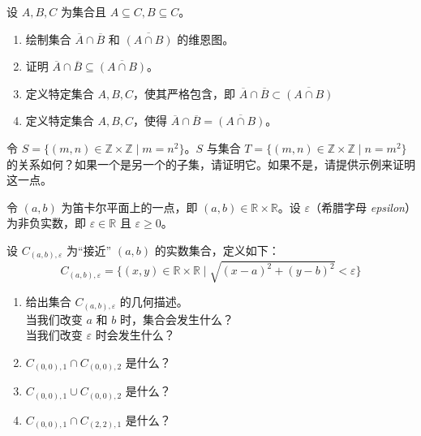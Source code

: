 \begin{exercise}
    设 $A, B, C$ 为集合且 $A \subseteq C, B \subseteq C$。
    \begin{enumerate}[label=(\alph*)]
        \item 绘制集合 $\overline{A} \cap \overline{B}$ 和 $\overline{(A \cap B)}$ 的维恩图。
        \item 证明 $\overline{A} \cap \overline{B} \subseteq \overline{(A \cap B)}$。
        \item 定义特定集合 $A,B,C$，使其严格包含，即 $\overline{A} \cap \overline{B} \subset \overline{(A \cap B)}$
        \item 定义特定集合 $A,B,C$，使得 $\overline{A} \cap \overline{B} = \overline{(A \cap B)}$。
    \end{enumerate}
\end{exercise}

\begin{exercise}
    令 $S = \{(m, n) \in \mathbb{Z} \times \mathbb{Z} \mid m = n^2\}$。$S$ 与集合 $T = \{(m, n) \in \mathbb{Z} \times \mathbb{Z} \mid n = m^2\}$ 的关系如何？如果一个是另一个的子集，请证明它。如果不是，请提供示例来证明这一点。
\end{exercise}

\begin{exercise}
    令 $(a,b)$ 为笛卡尔平面上的一点，即 $(a,b) \in \mathbb{R} \times \mathbb{R}$。设 $\varepsilon$（希腊字母 \emph{epsilon}）为非负实数，即 $\varepsilon \in \mathbb{R}$ 且 $\varepsilon \ge 0$。

    设 $C_{(a,b),\varepsilon}$ 为``接近'' $(a, b)$ 的实数集合，定义如下：
    \[C_{(a,b),\varepsilon} = \Big\{(x, y) \in \mathbb{R} \times \mathbb{R} \mid \sqrt{(x - a)^2 + (y - b)^2} < \varepsilon\Big\}\]
    \begin{enumerate}
        \item 给出集合 $C_{(a,b),\varepsilon}$ 的几何描述。\\
        当我们改变 $a$ 和 $b$ 时，集合会发生什么？\\
        当我们改变 $\varepsilon$ 时会发生什么？
        \item $C_{(0,0),1} \cap C_{(0,0),2}$ 是什么？
        \item $C_{(0,0),1} \cup C_{(0,0),2}$ 是什么？
        \item $C_{(0,0),1} \cap C_{(2,2),1}$ 是什么？
    \end{enumerate}
\end{exercise}


